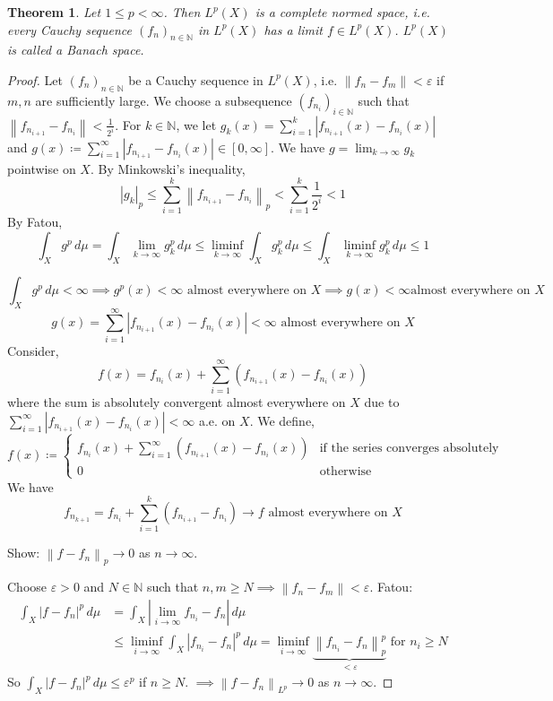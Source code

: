 \documentclass{article}
\newtheorem{theorem}{Theorem}  \numberwithin{theorem}{section}
\newcommand{\norm}[1]{\left\|#1\right\|}
\newcommand{\card}[1]{\left|#1\right|}
\begin{document}
\begin{theorem}
  Let $1 \leq p < \infty$. Then $L^p(X)$ is a complete normed space, i.e. every Cauchy sequence $(f_n)_{n \in \mathbb N}$ in $L^p(X)$ has a limit $f \in L^p(X)$. $L^p(X)$ is called a \emph{Banach space}.
\end{theorem}
\begin{proof}
  Let $(f_n)_{n \in \mathbb N}$ be a Cauchy sequence in $L^p(X)$, i.e. $\norm{f_n - f_m} < \varepsilon$ if $m,n$ are sufficiently large.
  We choose a subsequence $(f_{n_i})_{i \in \mathbb N}$ such that $\norm{f_{n_{i+1}} - f_{n_{i}}} < \frac{1}{2^i}$.
  For $k \in \mathbb N$, we let $g_k(x) = \sum_{i=1}^k \card{f_{n_{i+1}}(x) - f_{n_i}(x)}$ and $g(x) \coloneqq \sum_{i=1}^\infty \card{f_{n_{i+1}} - f_{n_{i}}(x)} \in [0,\infty]$. We have $g = \lim_{k\to\infty} g_k$ pointwise on $X$. By Minkowski's inequality,
  \[ \card{g_k}_p \leq \sum_{i=1}^k \norm{f_{n_{i+1}} - f_{n_i}}_p < \sum_{i=1}^k \frac{1}{2^i} < 1 \]
  By Fatou,
  \[ \int_X g^p \, d\mu = \int_X \lim_{k\to\infty} g_k^p \, d\mu \leq \liminf_{k\to\infty} \int_X g_k^p \, d\mu \leq \int_X \liminf_{k\to\infty} g_k^p \, d\mu \leq 1 \] %

  \[ \int_X g^p \, d\mu < \infty \implies g^p(x) < \infty \text{ almost everywhere on } X \implies g(x) < \infty \text{almost everywhere on } X \]
  \[ g(x) = \sum_{i=1}^{\infty} \card{f_{n_{i+1}}(x) - f_{n_i}(x)}  < \infty \text{ almost everywhere on } X \]
  Consider,
  \[ f(x) = f_{n_i}(x) + \sum_{i=1}^{\infty} \left(f_{n_{i+1}}(x) - f_{n_i}(x)\right) \]
  where the sum is absolutely convergent almost everywhere on $X$ due to $\sum_{i=1}^{\infty} \card{f_{n_{i+1}}(x) - f_{n_i}(x)}  < \infty$ a.e. on $X$.
  We define,
  \[
    f(x) \coloneqq \begin{cases}
      f_{n_i}(x) + \sum_{i=1}^\infty \left(f_{n_{i+1}}(x) - f_{n_i}(x)\right) & \text{if the series converges absolutely} \\
      0 & \text{otherwise}
    \end{cases}
  \]
  We have
  \[ f_{n_{k+1}} = f_{n_i} + \sum_{i=1}^k \left(f_{n_{i+1}} - f_{n_i}\right) \to f \text{ almost everywhere on } X \]

  Show: $\norm{f - f_n}_p \to 0$ as $n \to \infty$.

  Choose $\varepsilon > 0$ and $N \in \mathbb N$ such that $n,m \geq N \implies \norm{f_n - f_m} < \varepsilon$. Fatou:
  \begin{align*}
    \int_X \card{f - f_n}^p \, d\mu &= \int_X \card{\lim_{i\to\infty} f_{n_i} - f_n} \, d\mu \\
      &\leq \liminf_{i\to\infty} \int_X \card{f_{n_i} - f_n}^p \, d\mu = \liminf_{i\to\infty} \underbrace{\norm{f_{n_i} - f_n}_p^p}_{< \varepsilon} \text{ for } n_i \geq N
  \end{align*}
  So $\int_X \card{f - f_n}^p \, d\mu \leq \varepsilon^p$ if $n \geq N$. $\implies \norm{f - f_n}_{L^p} \to 0$ as $n \to \infty$.


\end{proof}
\end{document}

